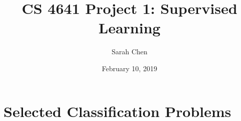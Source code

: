 \documentclass[11pt, a4paper]{article} %
\title{CS 4641 Project 1: Supervised Learning} %
\author{
Sarah Chen %
  }
\date{\small February 10, 2019} %
\begin{document}
%

\maketitle %

\begin{center} %
\end{center}

\setcounter{page}{1} %

\section{Selected Classification Problems} %
\end{document}
